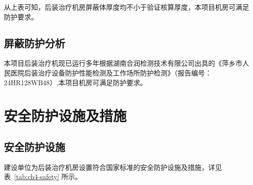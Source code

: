 从上表可知，后装治疗机房屏蔽体厚度均不小于验证核算厚度，本项目机房可满足防护要求。

\subsection{屏蔽防护分析}

本项目后装治疗机现已运行多年根据湖南合润检测技术有限公司出具的《萍乡市人民医院后装治疗设备防护性能检测及工作场所防护检测》（报告编号：24HR128WB48）,本项目机房可满足防护要求。

\section{安全防护设施及措施}

\subsection{安全防护设施}

建设单位为后装治疗机房设置符合国家标准的安全防护设施及措施，详见表~\ref{tab:ch4-safety} 所示。


